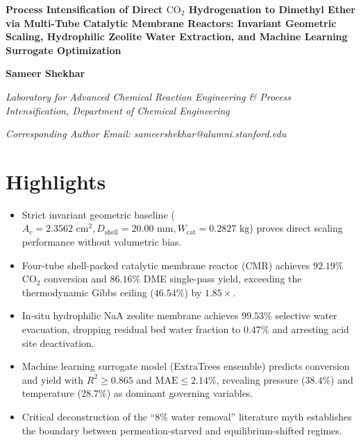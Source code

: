 \documentclass[12pt,a4paper]{article}
\begin{document}
\begin{center}
    {\fontsize{16}{22}\bfseries Process Intensification of Direct $\text{CO}_2$ Hydrogenation to Dimethyl Ether via Multi-Tube Catalytic Membrane Reactors: Invariant Geometric Scaling, Hydrophilic Zeolite Water Extraction, and Machine Learning Surrogate Optimization \par}
    \vspace{12pt}
    {\fontsize{12}{16}\bfseries Sameer Shekhar \par}
    \vspace{4pt}
    {\fontsize{11}{14}\itshape Laboratory for Advanced Chemical Reaction Engineering \& Process Intensification, Department of Chemical Engineering \par}
    {\fontsize{10}{14}\itshape Corresponding Author Email: sameershekhar@alumni.stanford.edu \par}
\end{center}

\vspace{12pt}

\section*{Highlights}
\begin{itemize}
    \item Strict invariant geometric baseline ($A_c = 2.3562\text{ cm}^2, D_{\text{shell}} = 20.00\text{ mm}, W_{\text{cat}} = 0.2827\text{ kg}$) proves direct scaling performance without volumetric bias.
    \item Four-tube shell-packed catalytic membrane reactor (CMR) achieves $92.19\%$ $\text{CO}_2$ conversion and $86.16\%$ DME single-pass yield, exceeding the thermodynamic Gibbs ceiling ($46.54\%$) by $1.85\times$.
    \item In-situ hydrophilic NaA zeolite membrane achieves $99.53\%$ selective water evacuation, dropping residual bed water fraction to $0.47\%$ and arresting acid site deactivation.
    \item Machine learning surrogate model (ExtraTrees ensemble) predicts conversion and yield with $R^2 \ge 0.865$ and $\text{MAE} \le 2.14\%$, revealing pressure ($38.4\%$) and temperature ($28.7\%$) as dominant governing variables.
    \item Critical deconstruction of the ``8\% water removal'' literature myth establishes the boundary between permeation-starved and equilibrium-shifted regimes.
\end{itemize}
\end{document}
